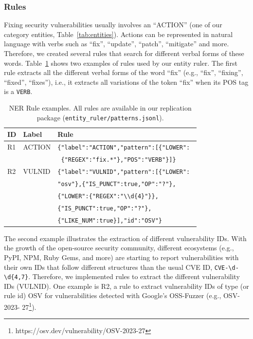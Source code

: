 \subsubsection{Rules} Fixing security vulnerabilities 
usually involves an ``ACTION'' (one of our category entities, Table~\ref{tab:entities}). Actions can be represented in natural language with verbs such as ``fix'', ``update'', ``patch'', ``mitigate'' and more. Therefore, we created several rules that search for different verbal forms of these words. 
Table~\ref{tab:rules} shows two examples of rules used by our entity ruler. The first rule extracts all the different verbal forms of the word ``fix'' (e.g., ``fix'', ``fixing'', ``fixed'', ``fixes''), i.e., it extracts all variations of the token ``fix'' when its POS tag is a \texttt{VERB}. 

\begin{table}[t!]
\footnotesize
    \centering
        \caption{NER Rule examples. All rules are 
        available in our replication package 
        (\texttt{entity\_ruler/patterns.jsonl}).} 
    \begin{tabular}{ | p{0.25cm} | p{1.25cm} | p{6cm} | }
    \hline
        \textbf{ID} & \textbf{Label} & \textbf{Rule}\\\hline
        R1 & ACTION & \verb|{"label":"ACTION","pattern":[{"LOWER": |\\& & \verb| {"REGEX":"fix.*"},"POS":"VERB"}]}|  \\\hline
        R2 &  VULNID & \verb|{"label":"VULNID","pattern":[{"LOWER":|\\& & \verb|"osv"},{"IS_PUNCT":true,"OP":"?"},|\\& & \verb|{"LOWER":{"REGEX":"\\d{4}"}},|\\& & \verb|{"IS_PUNCT":true,"OP":"?"},|\\& & \verb|{"LIKE_NUM":true}],"id":"OSV"}| 
        \\\hline
    \end{tabular}
    \label{tab:rules}
\end{table}

The second example
illustrates the extraction of different vulnerability IDs. With the 
growth of the open-source security community, different 
ecosystems (e.g., PyPI, NPM, Ruby Gems, and more) are 
starting to report vulnerabilities with their own IDs that 
follow different structures than the usual CVE ID, \verb|CVE-\d-\d{4,7}|. Therefore, we implemented rules to extract the 
different vulnerability IDs (VULNID). One example is R2, 
a rule to extract vulnerability IDs of type (or rule id) OSV for vulnerabilities 
detected with Google's OSS-Fuzzer (e.g., OSV-2023-
27\footnote{https://osv.dev/vulnerability/OSV-2023-27}). 

